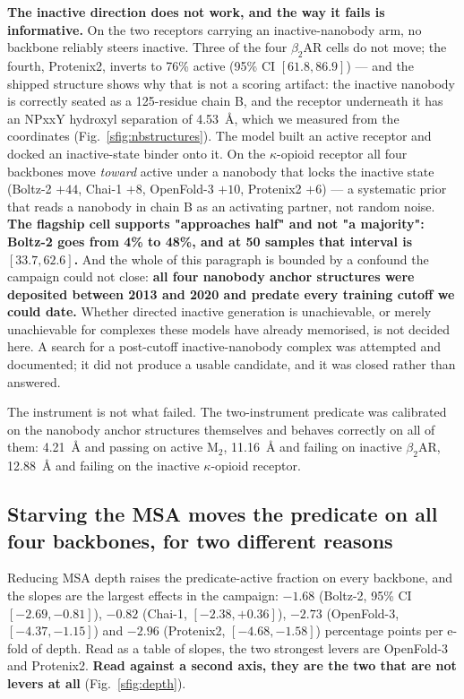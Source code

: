 \textbf{The inactive direction does not work, and the way it fails is
informative.} On the two receptors carrying an inactive-nanobody arm, no
backbone reliably steers inactive. Three of the four $\beta_2$AR cells do not
move; the fourth, Protenix2, inverts to 76\% active
(95\% CI $[61.8, 86.9]$) --- and the shipped structure shows why that is not a
scoring artifact: the inactive nanobody is correctly seated as a 125-residue
chain B, and the receptor underneath it has an NPxxY hydroxyl separation of
4.53~\AA{}, which we measured from the coordinates (Fig.~\ref{sfig:nbstructures}).
The model built an active receptor and docked an inactive-state binder onto it.
On the $\kappa$-opioid receptor all four backbones move \emph{toward} active
under a nanobody that locks the inactive state (Boltz-2 $+44$, Chai-1 $+8$,
OpenFold-3 $+10$, Protenix2 $+6$) --- a systematic prior that reads a nanobody
in chain B as an activating partner, not random noise. \textbf{The flagship cell
supports "approaches half" and not "a majority": Boltz-2 goes from 4\% to 48\%,
and at 50 samples that interval is $[33.7, 62.6]$.} And the whole of this
paragraph is bounded by a confound the campaign could not close:
\textbf{all four nanobody anchor structures were deposited between 2013 and 2020
and predate every training cutoff we could date.} Whether directed inactive
generation is unachievable, or merely unachievable for complexes these models
have already memorised, is not decided here. A search for a post-cutoff
inactive-nanobody complex was attempted and documented; it did not produce a
usable candidate, and it was closed rather than answered.

The instrument is not what failed. The two-instrument predicate was calibrated
on the nanobody anchor structures themselves and behaves correctly on all of
them: 4.21~\AA{} and passing on active M$_2$, 11.16~\AA{} and failing on
inactive $\beta_2$AR, 12.88~\AA{} and failing on the inactive $\kappa$-opioid
receptor.

\subsection*{Starving the MSA moves the predicate on all four backbones, for two different reasons}

Reducing MSA depth raises the predicate-active fraction on every backbone, and
the slopes are the largest effects in the campaign: $-1.68$
(Boltz-2, 95\% CI $[-2.69, -0.81]$), $-0.82$ (Chai-1, $[-2.38, +0.36]$),
$-2.73$ (OpenFold-3, $[-4.37, -1.15]$) and $-2.96$ (Protenix2,
$[-4.68, -1.58]$) percentage points per e-fold of depth. Read as a table of
slopes, the two strongest levers are OpenFold-3 and Protenix2.
\textbf{Read against a second axis, they are the two that are not levers at
all} (Fig.~\ref{sfig:depth}).

